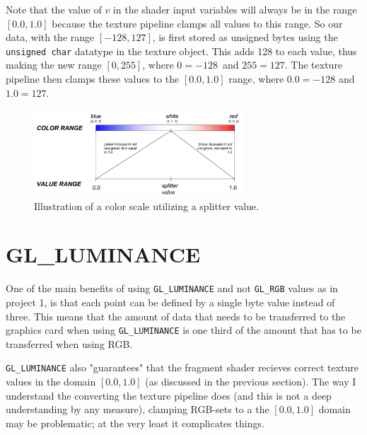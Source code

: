 \documentclass[a4paper, english, 12pt]{article}
\begin{document}
Note that the value of $v$ in the shader input variables will always be in the range $[0.0, 1.0]$ because the texture pipeline clamps all values to this range. So our data, with the range $[-128, 127]$, is first stored as unsigned bytes using the \texttt{unsigned char} datatype in the texture object. This adds 128 to each value, thus making the new range $[0, 255]$, where $0 = -128$ and $255 = 127$. The texture pipeline then clamps these values to the $[0.0, 1.0]$ range, where $0.0 = -128$ and $1.0 = 127$.

\begin{figure}[H]
\centering
\includegraphics[width=0.7\textwidth]{graphics/splitter.png}
\caption{Illustration of a color scale utilizing a splitter value.}
\label{fig:splitter}
\end{figure}


\pagebreak


\section{GL\_LUMINANCE}
\label{sec:gl_luminance}

One of the main benefits of using \texttt{GL\_LUMINANCE} and not \texttt{GL\_RGB} values as in project 1, is that each point can be defined by a single byte value instead of three. This means that the amount of data that needs to be transferred to the graphics card when using \texttt{GL\_LUMINANCE} is one third of the amount that has to be transferred when using RGB.

\texttt{GL\_LUMINANCE} also "guarantees" that the fragment shader recieves correct texture values in the domain $[0.0, 1.0]$ (as discussed in the previous section). The way I understand the converting the texture pipeline does (and this is not a deep understanding by any measure), clamping RGB-sets to a the $[0.0,1.0]$ domain may be problematic; at the very least it complicates things.
\end{document}
